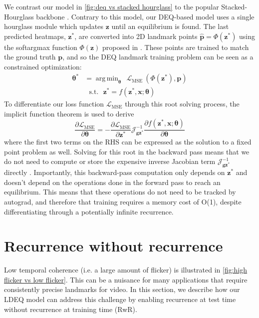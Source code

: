 \documentclass[10pt,twocolumn,letterpaper]{article}
\def\vtheta{{\bm{\theta}}}
\def\vg{{\bm{g}}}
\def\vp{{\bm{p}}}
\def\vx{{\bm{x}}}
\def\vz{{\bm{z}}}
\DeclareMathOperator*{\argmin}{arg\,min}
\begin{document}
We contrast our model in \cref{fig:deq vs stacked hourglass} to the popular Stacked-Hourglass backbone \cite{Newell2016StackedHourglass}. Contrary to this model, our DEQ-based model uses a single hourglass module which updates $\vz$ until an equilibrium is found. The last predicted heatmaps, $\vz^*$, are converted into 2D landmark points $\hat{\vp} = \Phi(\vz^*)$ using the softargmax function $\Phi(\vz)$ proposed in \cite{Luvizon2017SoftArgmax}. These points are trained to match the ground truth $\vp$, and so the DEQ landmark training problem can be seen as a constrained optimization:
\begin{equation}
\begin{aligned}
    \vtheta^* &= \argmin_{\vtheta} ~~\mathcal{L}_{\text{MSE}}~(\Phi(\vz^*), \vp) \\
    & ~~~\text{s.t.}~~~ \vz^* = f(\vz^*, \vx; \vtheta)
\end{aligned}
\label{eq: constrained deq main formulation}
\end{equation}
To differentiate our loss function $\mathcal{L}_{\text{MSE}}$ through this root solving process, the implicit function theorem is used \cite{Bai2019DEQs} to derive
\begin{equation}
\frac{\partial \mathcal{L}_{\text{MSE}}} {\partial \vtheta} = - \frac{\partial \mathcal{L}_{\text{MSE}}} {\partial \vz^*}  \mathcal{J}^{-1}_{\vg \vz^*} \frac{\partial f(\vz^*, \vx;\vtheta) }{\partial \vtheta}
\end{equation}
where the first two terms on the RHS can be expressed as the solution to a fixed point problem as well. Solving for this root in the backward pass means that we do not need to compute or store the expensive inverse Jacobian term $\mathcal{J}^{-1}_{\vg \vz^*}$ directly \cite{Bai2019DEQs, DeepImplicitLayerTutorial}. Importantly, this backward-pass computation only depends on $\vz^*$ and doesn't depend on the operations done in the forward pass to reach an equilibrium. This means that these operations do not need to be tracked by autograd, and therefore that training requires a memory cost of O(1), despite differentiating through a potentially infinite recurrence.

\section{Recurrence without recurrence}

Low temporal coherence (i.e. a large amount of flicker) is illustrated in \cref{fig:high flicker vs low flicker}. This can be a nuisance for many applications that require consistently precise landmarks for video. In this section, we describe how our LDEQ model can address this challenge by enabling recurrence at test time without recurrence at training time (RwR).
\end{document}
